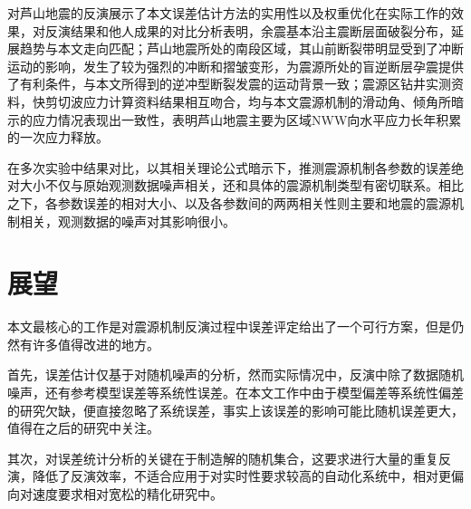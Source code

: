 对芦山地震的反演展示了本文误差估计方法的实用性以及权重优化在实际工作的效果，对反演结果和他人成果的对比分析表明，余震基本沿主震断层面破裂分布，延展趋势与本文走向匹配；芦山地震所处的南段区域，其山前断裂带明显受到了冲断运动的影响，发生了较为强烈的冲断和摺皱变形，为震源所处的盲逆断层孕震提供了有利条件，与本文所得到的逆冲型断裂发震的运动背景一致；震源区钻井实测资料，快剪切波应力计算资料结果相互吻合，均与本文震源机制的滑动角、倾角所暗示的应力情况表现出一致性，表明芦山地震主要为区域NWW向水平应力长年积累的一次应力释放。

在多次实验中结果对比，以其相关理论公式暗示下，推测震源机制各参数的误差绝对大小不仅与原始观测数据噪声相关，还和具体的震源机制类型有密切联系。相比之下，各参数误差的相对大小、以及各参数间的两两相关性则主要和地震的震源机制相关，观测数据的噪声对其影响很小。

\section{展望}
本文最核心的工作是对震源机制反演过程中误差评定给出了一个可行方案，但是仍然有许多值得改进的地方。

首先，误差估计仅基于对随机噪声的分析，然而实际情况中，反演中除了数据随机噪声，还有参考模型误差等系统性误差。在本文工作中由于模型偏差等系统性偏差的研究欠缺，便直接忽略了系统误差，事实上该误差的影响可能比随机误差更大，值得在之后的研究中关注。

其次，对误差统计分析的关键在于制造解的随机集合，这要求进行大量的重复反演，降低了反演效率，不适合应用于对实时性要求较高的自动化系统中，相对更偏向对速度要求相对宽松的精化研究中。
